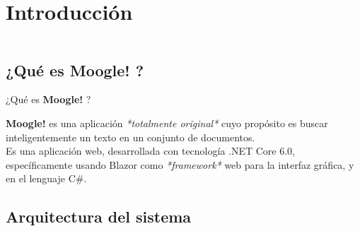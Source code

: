 \section{Introducción}\label{Intro}


\begin{frame}
    \begin{columns}[t]
        \begin{column}{.5\textwidth}
          \tableofcontents[sections={1-2},currentsection]
        \end{column}
        \begin{column}{.5\textwidth}
          \tableofcontents[sections={3-4},currentsection]
        \end{column}
    \end{columns}
\end{frame}

\subsection{¿Qué es \textbf{Moogle!} ?}


\begin{frame}{¿Qué es \textbf{Moogle!} ?}
\begin{center}
    \textbf{Moogle!} es una aplicación \emph{*totalmente original*} cuyo propósito es buscar inteligentemente
    un texto en un conjunto de documentos.\\
    \pause
    Es una aplicación web, desarrollada con tecnología .NET Core 6.0, específicamente usando 
    Blazor como \emph{*framework*} web para la interfaz gráfica, y en el lenguaje C\#.
\end{center}
\end{frame}

\subsection{Arquitectura del sistema}

